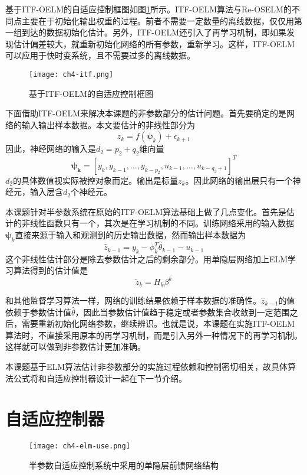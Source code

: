 基于ITF-OELM的自适应控制框图如图\ref{fig.itf-oelm}所示。ITF-OELM算法与Re-OSELM的不同点主要在于初始化输出权重的过程。前者不需要一定数量的离线数据，仅仅用第一组到达的数据初始化估计。另外，ITF-OELM还引入了再学习机制，即如果发现估计偏差较大，就重新初始化网络的所有参数，重新学习。这样，ITF-OELM可以应用于快时变系统，且不需要过多的离线数据。
\begin{figure}[!htb]
  \centering
  \texttt{[image: ch4-itf.png]}\\	 %
  \caption{基于ITF-OELM的自适应控制框图}
  \label{fig.itf-oelm}
\end{figure}

下面借助ITF-OELM来解决本课题的非参数部分的估计问题。首先要确定的是网络的输入输出样本数据。本文要估计的非线性部分为
\begin{equation}
z_{k} = f(\bm{\psi}_{k}) + \epsilon_{k+1}
\end{equation}
因此，神经网络的输入是$d_{2}=p_{2}+q_{2}$维向量
$$\bm{\psi_{k}}=[y_{k},y_{k-1},\ldots,y_{k-p_{2}},u_{k-1},\dots,u_{k-q_{2}+1}]^{T}$$
$d_{2}$的具体数值视实际被控对象而定。输出是标量$z_{k}$。因此网络的输出层只有一个神经元，输入层含$d_{2}$个神经元。

本课题针对半参数系统在原始的ITF-OELM算法基础上做了几点变化。首先是估计的非线性函数只有一个，其次是在学习机制的不同。训练网络采用的输入数据$\bm{\psi}_{k}$直接来源于输入和观测到的历史输出数据，然而输出样本数据为
\begin{equation}\label{eq:4.hatz}
\hat{z}_{k-1}=y_{k}-\phi_{k}^{T}\hat{\theta}_{k-1}-u_{k-1}
\end{equation}
这个非线性估计部分是除去参数估计之后的剩余部分。用单隐层网络加上ELM学习算法得到的估计值是
\begin{equation}\label{eq:4.z.breave}
\breve{z}_{k}=H_{k}\beta^{k}
\end{equation}

和其他监督学习算法一样，网络的训练结果依赖于样本数据的准确性。$\hat{z}_{k-1}$的值依赖于参数估计值$\hat{\theta}$，因此当参数估计值趋于稳定或者参数集合收敛到一定范围之后，需要重新初始化网络参数，继续辨识。也就是说，本课题在实施ITF-OELM算法时，不直接采用原本的再学习机制，而是引入另外一种情况下的再学习机制。这样就可以做到非参数估计更加准确。

本课题基于ELM算法估计非参数部分的实施过程依赖和控制密切相关，故具体算法公式将和自适应控制器设计一起在下一节介绍。

\section{自适应控制器}\label{sect:4.3}
\begin{figure}[!htb]
  \centering
  \texttt{[image: ch4-elm-use.png]}\\	 %
  \caption{半参数自适应控制系统中采用的单隐层前馈网络结构}
  \label{fig.elm.use}
\end{figure}

